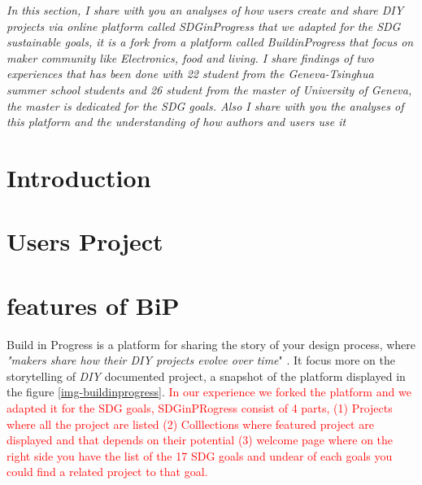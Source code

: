 \begin{center}
	\begin{minipage}{.7\textwidth}
		\textit{In this section, I share with you an analyses of how users create and share \textit{DIY} projects via online platform called \textit{SDGinProgress} that we adapted for the SDG sustainable goals, it is a fork from a platform called \textit{BuildinProgress} that focus on maker community like Electronics, food and living. I share findings of two experiences that has been done with 22 student from the Geneva-Tsinghua summer school students and 26 student from the master of University of Geneva, the master is dedicated for the SDG goals. Also I share with you the analyses of this platform and the understanding of how authors and users use it}
	\end{minipage}
\end{center}
\section{Introduction}

\section{Users Project}

\section{features of BiP}

Build in Progress is a platform for sharing the story of your design process, where \textit{"makers share how their DIY projects evolve over time}" \cite{tseng2016making}. It focus more on the storytelling of \textit{DIY} documented project, a snapshot of the platform displayed in the figure \ref{img-buildinprogress}. \textcolor{red}{In our experience we forked the platform and we adapted it for the SDG goals, SDGinPRogress consist of 4 parts, (1) Projects where all the project are listed (2) Colllections where featured project are displayed and that depends on their potential (3) welcome page where on the right side you have the list of the 17 SDG goals and undear of each goals you could find a related project to that goal.}

